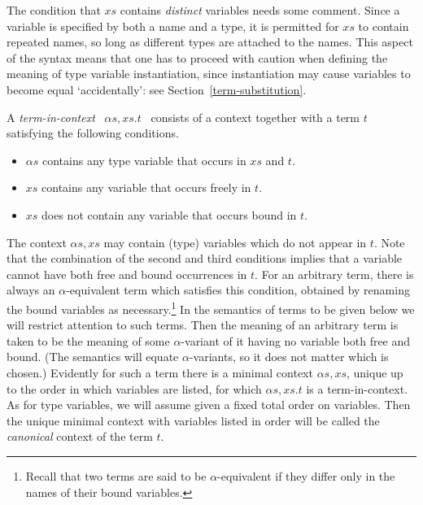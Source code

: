 The condition that $x\!s$ contains {\em distinct\/} variables needs
some comment. Since a variable is specified by both a name and a
type,  it is permitted for $x\!s$ to contain repeated
names,
 so long as different types are attached to the
names. This aspect of the syntax means that one has to proceed with
caution when defining the meaning of type variable instantiation,
since instantiation may cause variables to become equal
`accidentally': see Section~\ref{term-substitution}.

A {\em term-in-context\/}
$\:\;\alpha\!s,\!x\!s.t\;\:$ consists of a context together with a term
$t$ satisfying the following conditions.
\begin{itemize}

\item $\alpha\!s$ contains any type variable that occurs in $x\!s$ and $t$.
 
\item $x\!s$ contains any variable that occurs freely in $t$.
 
\item $x\!s$ does not contain any variable that occurs
bound in $t$.

\end{itemize}
The context $\alpha\!s,\!x\!s$ may contain (type) variables which do
not appear in $t$.  Note that the combination of the second and third
conditions implies that a variable cannot have both free and bound
occurrences in $t$. For an arbitrary term, there is always an
$\alpha$-equivalent term which satisfies this condition, obtained by
renaming the bound variables as necessary.\footnote{Recall that two
terms are said to be $\alpha$-equivalent if they differ only in the
names of their bound variables.} In the semantics of terms to be given
below we will restrict attention to such terms. Then the meaning of an
arbitrary term is taken to be the meaning of some $\alpha$-variant of
it having no variable both free and bound. (The semantics will equate
$\alpha$-variants, so it does not matter which is chosen.) Evidently
for such a term there is a minimal context $\alpha\!s,\!x\!s$, unique
up to the order in which variables are listed, for which
$\alpha\!s,\!x\!s.t$ is a term-in-context. As for type variables, we
will assume given a fixed total order on variables.  Then the unique
minimal context with variables listed in order will be called the {\em
canonical} context of the term $t$.

